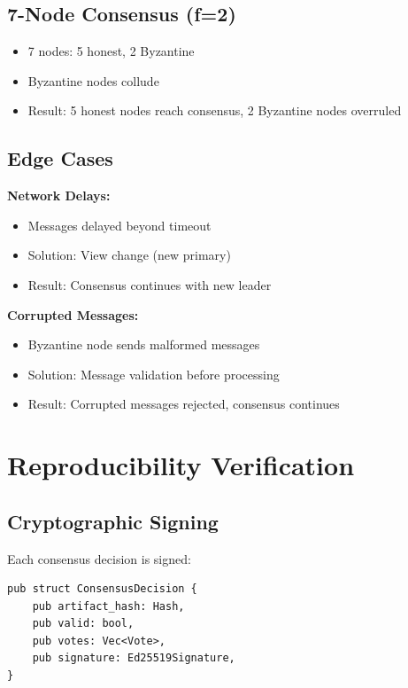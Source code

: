 \subsection{7-Node Consensus (f=2)}

\begin{itemize}
    \item 7 nodes: 5 honest, 2 Byzantine
    \item Byzantine nodes collude
    \item Result: 5 honest nodes reach consensus, 2 Byzantine nodes overruled
\end{itemize}

\subsection{Edge Cases}

\textbf{Network Delays:}
\begin{itemize}
    \item Messages delayed beyond timeout
    \item Solution: View change (new primary)
    \item Result: Consensus continues with new leader
\end{itemize}

\textbf{Corrupted Messages:}
\begin{itemize}
    \item Byzantine node sends malformed messages
    \item Solution: Message validation before processing
    \item Result: Corrupted messages rejected, consensus continues
\end{itemize}

\section{Reproducibility Verification}

\subsection{Cryptographic Signing}

Each consensus decision is signed:

\begin{verbatim}
pub struct ConsensusDecision {
    pub artifact_hash: Hash,
    pub valid: bool,
    pub votes: Vec<Vote>,
    pub signature: Ed25519Signature,
}
\end{verbatim}

